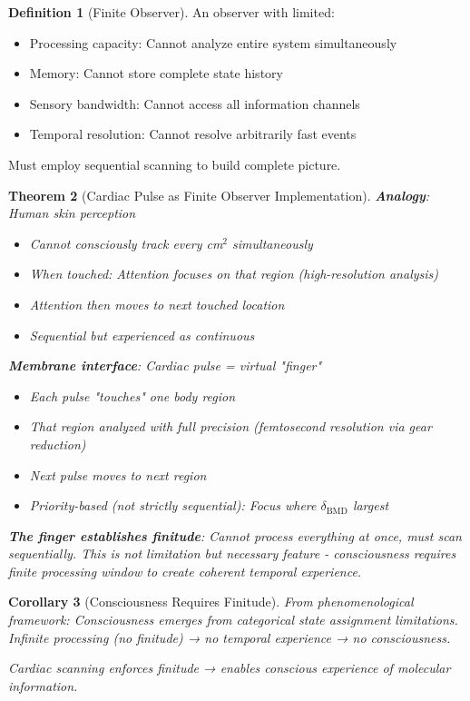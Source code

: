 \documentclass[11pt,a4paper]{article}
\newtheorem{theorem}{Theorem}[section]
\newtheorem{corollary}[theorem]{Corollary}
\theoremstyle{definition}
\newtheorem{definition}[theorem]{Definition}
\theoremstyle{remark}
\begin{document}
\begin{definition}[Finite Observer]
An observer with limited:
\begin{itemize}
\item Processing capacity: Cannot analyze entire system simultaneously
\item Memory: Cannot store complete state history
\item Sensory bandwidth: Cannot access all information channels
\item Temporal resolution: Cannot resolve arbitrarily fast events
\end{itemize}

Must employ sequential scanning to build complete picture.
\end{definition}

\begin{theorem}[Cardiac Pulse as Finite Observer Implementation]
\textbf{Analogy}: Human skin perception
\begin{itemize}
\item Cannot consciously track every cm$^2$ simultaneously
\item When touched: Attention focuses on that region (high-resolution analysis)
\item Attention then moves to next touched location
\item Sequential but experienced as continuous
\end{itemize}

\textbf{Membrane interface}: Cardiac pulse = virtual "finger"
\begin{itemize}
\item Each pulse "touches" one body region
\item That region analyzed with full precision (femtosecond resolution via gear reduction)
\item Next pulse moves to next region
\item Priority-based (not strictly sequential): Focus where $\delta_{\text{BMD}}$ largest
\end{itemize}

\textbf{The finger establishes finitude}: Cannot process everything at once, must scan sequentially. This is not limitation but \textit{necessary feature} - consciousness requires finite processing window to create coherent temporal experience.
\end{theorem}

\begin{corollary}[Consciousness Requires Finitude]
From phenomenological framework: Consciousness emerges from categorical state assignment limitations. Infinite processing (no finitude) → no temporal experience → no consciousness.

Cardiac scanning enforces finitude → enables conscious experience of molecular information.
\end{corollary}
\end{document}
